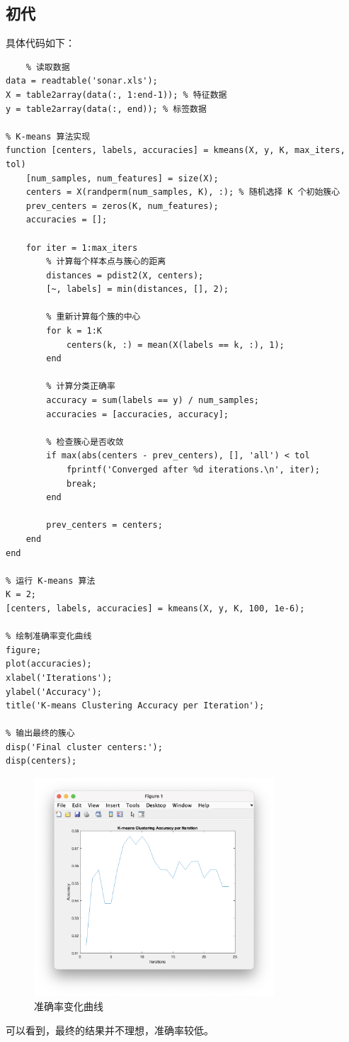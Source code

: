\documentclass[12pt,a4paper,oneside]{article}
\begin{document}
\subsection{初代}
具体代码如下：
\begin{lstlisting}
    % 读取数据
data = readtable('sonar.xls'); 
X = table2array(data(:, 1:end-1)); % 特征数据
y = table2array(data(:, end)); % 标签数据

% K-means 算法实现
function [centers, labels, accuracies] = kmeans(X, y, K, max_iters, tol)
    [num_samples, num_features] = size(X);
    centers = X(randperm(num_samples, K), :); % 随机选择 K 个初始簇心
    prev_centers = zeros(K, num_features);
    accuracies = [];
    
    for iter = 1:max_iters
        % 计算每个样本点与簇心的距离
        distances = pdist2(X, centers);
        [~, labels] = min(distances, [], 2);
        
        % 重新计算每个簇的中心
        for k = 1:K
            centers(k, :) = mean(X(labels == k, :), 1);
        end
        
        % 计算分类正确率
        accuracy = sum(labels == y) / num_samples;
        accuracies = [accuracies, accuracy];
        
        % 检查簇心是否收敛
        if max(abs(centers - prev_centers), [], 'all') < tol
            fprintf('Converged after %d iterations.\n', iter);
            break;
        end
        
        prev_centers = centers;
    end
end

% 运行 K-means 算法
K = 2;
[centers, labels, accuracies] = kmeans(X, y, K, 100, 1e-6);

% 绘制准确率变化曲线
figure;
plot(accuracies);
xlabel('Iterations');
ylabel('Accuracy');
title('K-means Clustering Accuracy per Iteration');

% 输出最终的簇心
disp('Final cluster centers:');
disp(centers);
\end{lstlisting}
\begin{figure}[H]
    \centering
    \includegraphics[width=0.8\textwidth]{image/1}
    \caption{准确率变化曲线}
\end{figure}
\qquad 可以看到，最终的结果并不理想，准确率较低。
\end{document}
